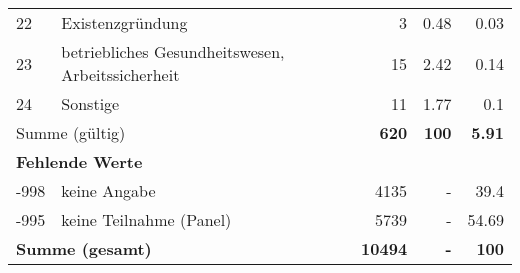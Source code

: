 \begin{longtable}{lXrrr}
        22 & \multicolumn{1}{X}{Existenzgründung} & %
          \num{3} &
          \num[round-mode=places,round-precision=2]{0.48} &
          \num[round-mode=places,round-precision=2]{0.03} \\

        23 & \multicolumn{1}{X}{betriebliches Gesundheitswesen, Arbeitssicherheit} & %
          \num{15} &
          \num[round-mode=places,round-precision=2]{2.42} &
          \num[round-mode=places,round-precision=2]{0.14} \\

        24 & \multicolumn{1}{X}{Sonstige} & %
          \num{11} &
          \num[round-mode=places,round-precision=2]{1.77} &
          \num[round-mode=places,round-precision=2]{0.1} \\

     \midrule
     \multicolumn{2}{l}{Summe (gültig)} &
       \textbf{\num{620}} &
     \textbf{\num{100}} &
       \textbf{\num[round-mode=places,round-precision=2]{5.91}} \\
     \multicolumn{5}{l}{\textbf{Fehlende Werte}}\\
       -998 &
       keine Angabe &
         \num{4135} &
        - &
         \num[round-mode=places,round-precision=2]{39.4} \\
       -995 &
       keine Teilnahme (Panel) &
         \num{5739} &
        - &
         \num[round-mode=places,round-precision=2]{54.69} \\
     \midrule
     \multicolumn{2}{l}{\textbf{Summe (gesamt)}} &
          \textbf{\num{10494}} &
        \textbf{-} &
        \textbf{\num{100}} \\
     \bottomrule
     \end{longtable}
     
